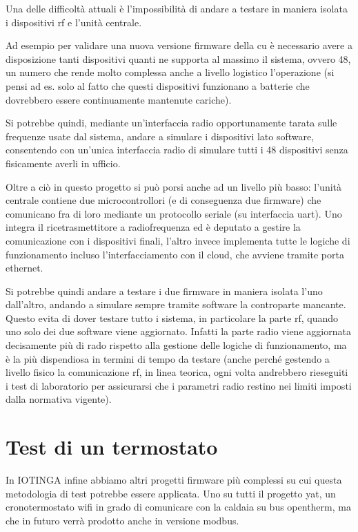 \documentclass[12pt,a4paper,twoside,titlepage]{book}
\begin{document}
Una delle difficoltà attuali è l'impossibilità di andare a testare in maniera isolata i
dispositivi \Gls{rf} e l'unità centrale.

Ad esempio per validare una nuova versione \gls{firmware} della \acrshort{cu} è necessario
avere a disposizione tanti dispositivi quanti ne supporta al massimo il sistema, ovvero 48, 
un numero che rende molto complessa anche a livello logistico l'operazione (si pensi ad es.
solo al fatto che questi dispositivi funzionano a batterie che dovrebbero essere continuamente
mantenute cariche).

Si potrebbe quindi, mediante un'interfaccia radio opportunamente tarata sulle frequenze usate
dal sistema, andare a simulare i dispositivi lato software, consentendo con un'unica interfaccia
radio di simulare tutti i 48 dispositivi senza fisicamente averli in ufficio.

Oltre a ciò in questo progetto si può porsi anche ad un livello più basso: l'unità
centrale contiene due microcontrollori (e di conseguenza due \gls{firmware}) che comunicano fra di
loro mediante un protocollo seriale (su interfaccia \acrshort{uart}). Uno integra il ricetrasmettitore
a radiofrequenza ed è deputato a gestire la comunicazione con i dispositivi
finali, l'altro invece implementa tutte le logiche di funzionamento incluso l'interfacciamento
con il cloud, che avviene tramite porta ethernet.

Si potrebbe quindi andare a testare i due \gls{firmware} in maniera isolata l'uno dall'altro,
andando a simulare sempre tramite software la controparte mancante. Questo evita di dover
testare tutto i sistema, in particolare la parte \acrshort{rf}, quando uno solo dei due software viene
aggiornato. Infatti la parte radio viene aggiornata decisamente più di rado rispetto alla
gestione delle logiche di funzionamento, ma è la più dispendiosa in termini di tempo da testare
(anche perché gestendo a livello fisico la comunicazione \acrshort{rf}, in linea teorica, ogni volta 
andrebbero rieseguiti i test di laboratorio per assicurarsi che i parametri radio restino nei limiti
imposti dalla normativa vigente).

\section{Test di un termostato}

In IOTINGA infine abbiamo altri progetti \gls{firmware} più complessi su cui questa metodologia
di test potrebbe essere applicata. Uno su tutti il progetto \acrfull{yat},
un cronotermostato \Gls{wifi} in grado di comunicare con la caldaia su bus \Gls{opentherm}, ma
che in futuro verrà prodotto anche in versione \Gls{modbus}.
\end{document}
